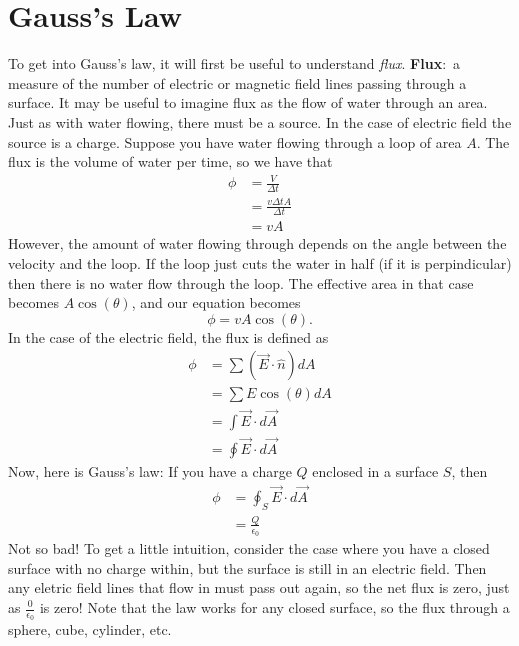 \documentclass[nobib]{tufte-handout}
\newcommand{\defn}[2]{\noindent\textbf{#1}:\ #2}
\begin{document}
\section{Gauss's Law}
To get into Gauss's law, it will first be useful to understand \emph{flux}. 
\defn{Flux}{a measure of the number of electric or magnetic field lines 
passing through a surface.} 
It may be useful to imagine flux as the flow of water through an area. 
Just as with water flowing, there must be a source. In the case of electric field 
the source is a charge. Suppose you have water flowing through a loop of area $A$. 
The flux is the volume of water per time, so we have that 
\begin{align*}
    \phi &= \frac{V}{\Delta t} \\
    &= \frac{v \Delta t A}{\Delta t} \\
    &= vA
\end{align*}
However, the amount of water flowing through depends on the angle between the 
velocity and the loop. If the loop just cuts the water in half (if it is perpindicular)
then there is no water flow through the loop. The effective area in that case becomes 
$A \cos(\theta)$, and our equation becomes 
\[\phi = vA\cos(\theta).\]
In the case of the electric field, the flux is defined as
\begin{align*}
    \phi &= \sum (\vec{E} \cdot \hat{n}) dA \\
    &= \sum E\cos(\theta) dA \\
    &= \int \vec{E} \cdot d\vec{A} \\
    &= \oint \vec{E} \cdot d\vec{A}
\end{align*}
Now, here is Gauss's law: 
If you have a charge $Q$ enclosed in a surface $S$, 
then 
\begin{align*}
    \phi &= \oint_S \vec{E} \cdot d\vec{A} \\
    &= \frac{Q}{\epsilon_0}
\end{align*}
Not so bad! To get a little intuition, consider
the case where you have a closed surface with 
no charge within, but the surface is still in an
electric field. Then any eletric field lines that 
flow in must pass out again, so the net flux is 
zero, just as $\frac{0}{\epsilon_0}$ is zero!
Note that the law works for any closed surface, so 
the flux through a sphere, cube, cylinder, etc. 
\end{document}
